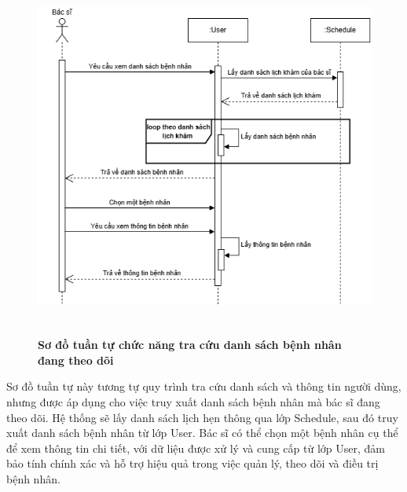 \begin{figure}[H]
	\centering
	\includegraphics[width=14cm,height=12cm]{Images/sequence/user/getPatientByDoctor.drawio.png}
	\caption[Sơ đồ tuần tự chức năng tra cứu danh sách bệnh nhân đang theo dõi]{\bfseries \fontsize{12pt}{0pt}
		\selectfont Sơ đồ tuần tự chức năng tra cứu danh sách bệnh nhân đang theo dõi}
	\label{sequence_get_patient} %
\end{figure}
Sơ đồ tuần tự này tương tự quy trình tra cứu danh sách và thông tin người dùng, nhưng được áp dụng cho việc truy xuất danh sách bệnh nhân mà bác sĩ đang theo dõi.
Hệ thống sẽ lấy danh sách lịch hẹn thông qua lớp Schedule, sau đó truy xuất danh sách bệnh nhân từ lớp User. Bác sĩ có thể chọn một bệnh nhân cụ thể để xem thông tin chi tiết,
với dữ liệu được xử lý và cung cấp từ lớp User, đảm bảo tính chính xác và hỗ trợ hiệu quả trong việc quản lý, theo dõi và điều trị bệnh nhân.

